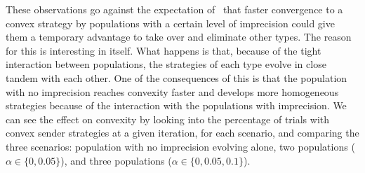 \documentclass[a4paper]{article}
\begin{document}
These observations go against the expectation of~\textcite{franke_vagueness_2017} that faster convergence to a convex strategy by populations with a certain level of imprecision could give them a temporary advantage to take over and eliminate other types.
The reason for this is interesting in itself.
What happens is that, because of the tight interaction between populations, the strategies of each type evolve in close tandem with each other.
One of the consequences of this is that the population with no imprecision reaches convexity faster and develops more homogeneous strategies because of the interaction with the populations with imprecision.
We can see the effect on convexity by looking into the percentage of trials with convex sender strategies at a given iteration, for each scenario, and comparing the three scenarios: population with no imprecision evolving alone, two populations ($\alpha \in \{0, 0.05\}$), and three populations ($\alpha \in \{0, 0.05, 0.1\}$).
\end{document}
